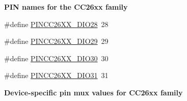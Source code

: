 \begin{Indent}{\bf P\-I\-N names for the C\-C26xx family}
\begin{DoxyCompactItemize}
\item 
\#define \hyperlink{_p_i_n_c_c26_x_x_8h_a1022f5ef1299a3d48c2816202fef95f8}{P\-I\-N\-C\-C26\-X\-X\-\_\-\-D\-I\-O28}~28
\item 
\#define \hyperlink{_p_i_n_c_c26_x_x_8h_a0aaff3357d986e4489e84a0ff3bff9dd}{P\-I\-N\-C\-C26\-X\-X\-\_\-\-D\-I\-O29}~29
\item 
\#define \hyperlink{_p_i_n_c_c26_x_x_8h_a2d36db877b96c9c26026c9c1c0514af3}{P\-I\-N\-C\-C26\-X\-X\-\_\-\-D\-I\-O30}~30
\item 
\#define \hyperlink{_p_i_n_c_c26_x_x_8h_aef532163bb931a46bcbcd00fc9ca8b18}{P\-I\-N\-C\-C26\-X\-X\-\_\-\-D\-I\-O31}~31
\end{DoxyCompactItemize}
\end{Indent}
\begin{Indent}{\bf Device-\/specific pin mux values for C\-C26xx family}\par
{\em \label{_p_i_n_c_c26_x_x_8h_PINCC26XX_MUX_VALS}%
\hypertarget{_p_i_n_c_c26_x_x_8h_PINCC26XX_MUX_VALS}{}%


}
\end{Indent}
